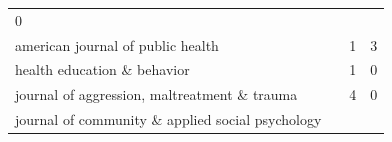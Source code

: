 \documentclass[]{tufte-handout}
\begin{document}
\begin{longtable}[]{@{}llll@{}}
\begin{minipage}[t]{0.06\columnwidth}
0\strut
\end{minipage}\tabularnewline
\begin{minipage}[t]{0.63\columnwidth}\raggedright\strut
american journal of public health\strut
\end{minipage} & \begin{minipage}[t]{0.04\columnwidth}\raggedright\strut
\strut
\end{minipage} & \begin{minipage}[t]{0.06\columnwidth}\raggedright\strut
1\strut
\end{minipage} & \begin{minipage}[t]{0.06\columnwidth}\raggedright\strut
3\strut
\end{minipage}\tabularnewline
\begin{minipage}[t]{0.63\columnwidth}\raggedright\strut
health education \& behavior\strut
\end{minipage} & \begin{minipage}[t]{0.04\columnwidth}\raggedright\strut
\strut
\end{minipage} & \begin{minipage}[t]{0.06\columnwidth}\raggedright\strut
1\strut
\end{minipage} & \begin{minipage}[t]{0.06\columnwidth}\raggedright\strut
0\strut
\end{minipage}\tabularnewline
\begin{minipage}[t]{0.63\columnwidth}\raggedright\strut
journal of aggression, maltreatment \& trauma\strut
\end{minipage} & \begin{minipage}[t]{0.04\columnwidth}\raggedright\strut
\strut
\end{minipage} & \begin{minipage}[t]{0.06\columnwidth}\raggedright\strut
4\strut
\end{minipage} & \begin{minipage}[t]{0.06\columnwidth}\raggedright\strut
0\strut
\end{minipage}\tabularnewline
\begin{minipage}[t]{0.63\columnwidth}\raggedright\strut
journal of community \& applied social psychology\strut
\end{minipage} & \begin{minipage}[t]{0.04\columnwidth}\raggedright\strut
\strut
\end{minipage} & \begin{minipage}[t]{0.06\columnwidth}\raggedright\strut

\end{minipage}
\end{longtable}
\end{document}

